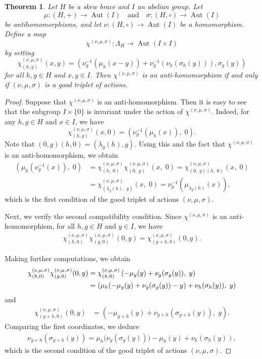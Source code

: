 \documentclass[11pt]{amsart}
\theoremstyle{thrm}
\theoremstyle{plain}
\newtheorem{thm}{Theorem}[section]
\theoremstyle{definition}
\newcommand{\Aut}{\operatorname{Aut} }
\numberwithin{equation}{section}
\begin{document}
\begin{thm}
	Let $H$ be a skew brace and $I$ an abelian group. Let
	\[
	\mu: (H, +) \rightarrow \Aut(I) \quad \text{and} \quad \sigma: (H, \circ) \rightarrow \Aut(I)
	\]
	be antihomomorphisms, and let $\nu: (H, \circ) \rightarrow \Aut(I)$ be a homomorphism. Define a map
	\[
	\chi^{(\nu, \mu, \sigma)} : \Lambda_H \longrightarrow \Aut(I \times I)
	\]
	by setting
	\[
	\chi^{(\nu, \mu, \sigma)}_{(h,g)}(x,y) = \left(  \nu^{-1}_g(\mu_h(x - y)) + \nu^{-1}_g(\nu_h(\sigma_h(y))),  \sigma_g(y)\right)
	\]
	for all $h, g \in H$ and $x, y \in I$. Then $\chi^{(\nu, \mu, \sigma)}$ is an anti-homomorphism if and only if $(\nu, \mu, \sigma)$ is a good triplet of actions.
\end{thm}
\begin{proof}
Suppose that $\chi^{(\nu, \mu, \sigma)}$ is an anti-homomorphism. Then it is easy to see that the subgroup $I \times \{0\}$ is invariant under the action of  $\chi^{(\nu, \mu, \sigma)}$. 
Indeed, for any $h, g \in H$ and $x \in I$, we have
\[
\chi^{(\nu, \mu, \sigma)}_{(h,g)}(x,0) = \left( \nu^{-1}_g(\mu_h(x)) , \; 0\right).
\]
Note that $(0,g)(h,0) = (\lambda_g(h), g)$. Using this and the fact that $\chi^{(\nu, \mu, \sigma)}$ is an anti-homomorphism, we obtain
\begin{align*}
	\left( \mu_h(\nu^{-1}_g(x)), \; 0 \right)  &=  \chi^{(\nu, \mu, \sigma)}_{(h,\;0)}
	 \chi^{(\nu, \mu, \sigma)}_{(0,\;g)}(x,\;0)  = 	\chi^{(\nu, \mu, \sigma)}_{(0,\;g)(h,\;0)}(x,\;0)\\
	&=   \chi^{(\nu, \mu, \sigma)}_{(\lambda_g(h),\; g)}(x, \;0) = \nu^{-1}_g(\mu_{\lambda_g(h)}(x)),
	\end{align*}
which is the first condition of the good triplet of actions $(\nu, \mu, \sigma)$.


Next, we verify the second compatibility condition. Since $\chi^{(\nu, \mu, \sigma)}$ is an anti-homomorphism, for all $h, g \in H$ and $y \in I$, we have
\begin{align*}
	\chi^{(\nu, \mu, \sigma)}_{(h,0)} \chi^{(\nu, \mu, \sigma)}_{(g,0)}(0,y) 
	= \chi^{(\nu, \mu, \sigma)}_{(g+h,0)}(0,y).
\end{align*}

Making further computations, we obtain
\begin{align} \label{second}
	\chi^{(\nu, \mu, \sigma)}_{(h,0)} \chi^{(\nu, \mu, \sigma)}_{(g,0)}(0,y) 
	&= \chi^{(\nu, \mu, \sigma)}_{(h,0)} \left( -\mu_g(y) + \nu_g(\sigma_g(y)), \; y \right) \notag \\
	&= \left( \mu_h\!\left( -\mu_g(y) + \nu_g(\sigma_g(y)) - y \right) + \nu_h(\sigma_h(y)), \; y \right)
\end{align}
and
\begin{align}\label{third}
	\chi^{(\nu, \mu, \sigma)}_{(g+h,0)}(0,y) 
	&= \left( -\mu_{g+h}(y) + \nu_{g+h}(\sigma_{g+h}(y)), \; y \right).
\end{align}
Comparing the first coordinates, we deduce
\begin{align*}
	\nu_{g+h}(\sigma_{g+h}(y)) 
	= \mu_h\!\big(\nu_g(\sigma_g(y))\big) - \mu_h(y) + \nu_h(\sigma_h(y)),
\end{align*}
which is the second condition of the  good triplet of actions $(\nu, \mu, \sigma)$.


\end{proof}
\end{document}
